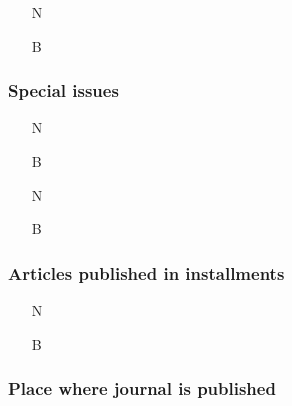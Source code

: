 \documentclass[11pt,letterpaper,oneside]{article}
\begin{document}
\begin{itemize}
\item[N] 

\item[B] 
\end{itemize}

\setcounter{subsubsection}{186}
\subsubsection{Special issues}
\label{14.187}


\begin{itemize}
\item[N] 

\item[B] 

\item[N] 

\item[B] 
\end{itemize}

\setcounter{subsubsection}{188}
\subsubsection{Articles published in installments}


\begin{itemize}
\item[N] 

\item[B] 
\end{itemize}

\setcounter{subsubsection}{190}
\subsubsection{Place where journal is published}
\end{document}
